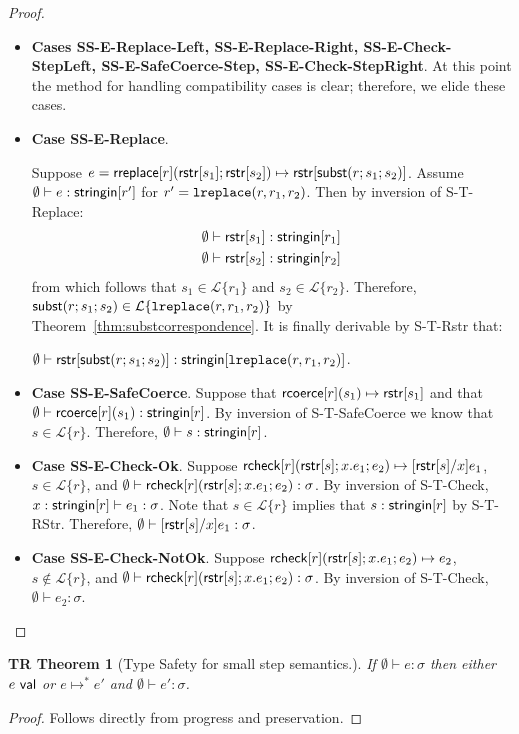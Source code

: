 \documentclass[12pt]{article}
\newcommand{\todo}[1]{{\color{red} #1}}
\newtheorem{trthm}[tr]{TR Theorem}
\theoremstyle{definition}
\newcommand{\Lagr}{\mathcal{L}}
\newcommand{\lang}[1]{\Lagr\{#1\}}
\newcommand{\rcoerce}[2]{{\sf rcoerce}[#1](#2)}
\newcommand{\val}{{\sf val}}
\newcommand{\rcheck}[4]{ {\sf rcheck}[#1](#2;#3;#4) }
\newcommand{\stringin}[1]{{\sf stringin}[#1]}
\newcommand{\lsubst}[3]{{\sf subst}(#1;#2;#3)} %
\newcommand{\lreplace}[3]{{\sf lreplace}(#1; #2; #3)}
\renewcommand{\lreplace}[3]{{\tt lreplace}(#1, #2, #3)}
\begin{document}
\begin{proof}
\begin{itemize}[label=$ $,itemsep=1ex]
\item \textbf{Cases SS-E-Replace-Left, SS-E-Replace-Right, SS-E-Check-StepLeft, SS-E-SafeCoerce-Step, SS-E-Check-StepRight}.
\todo{At this point the method for handling compatibility cases is clear; therefore,
we elide these cases.}

\item \textbf{Case SS-E-Replace}.

Suppose $e = \rreplace{r}{\rstr{s_1}}{\rstr{s_2}} \mapsto \rstr{\lsubst{r}{s_1}{s_2}}$.
Assume $\emptyset \vdash e : \stringin{r'}$ for $r' = \lreplace{r}{r_1}{r_2}$.
Then by inversion of S-T-Replace:
\begin{align*}
\emptyset &\vdash \rstr{s_1} : \stringin{r_1} \\
\emptyset &\vdash \rstr{s_2} : \stringin{r_2}
\end{align*}
from which follows that $s_1 \in \lang{r_1}$ and $s_2 \in \lang{r_2}$.
Therefore, $\lsubst{r}{s_1}{s_2} \in \lang{\lreplace{r}{r_1}{r_2}}$ by Theorem~\ref{thm:substcorrespondence}.
It is finally derivable by S-T-Rstr that:

$\emptyset \vdash \rstr{\lsubst{r}{s_1}{s_2}} : \stringin{\lreplace{r}{r_1}{r_2}}$.


\item \textbf{Case SS-E-SafeCoerce}.
Suppose that $\rcoerce{r}{s_1} \mapsto \rstr{s_1}$ and that $\emptyset\vdash \rcoerce{r}{s_1} : \stringin{r}$.
By inversion of S-T-SafeCoerce we know that $s \in \lang{r}$. Therefore, $\emptyset\vdash s : \stringin{r}$.

\item \textbf{Case SS-E-Check-Ok}.
Suppose $\rcheck{r}{\rstr{s}}{x.e_1}{e_2} \mapsto \subst{\rstr{s}}{x}{e_1}$,
$s \in \lang{r}$, and $\emptyset \vdash \rcheck{r}{\rstr{s}}{x.e_1}{e_2} : \sigma$.
By inversion of S-T-Check, $x : \stringin{r} \vdash e_1 : \sigma$.
Note that $s \in \lang{r}$ implies that $s : \stringin{r}$ by S-T-RStr.
Therefore, $\emptyset \vdash [{\sf rstr}[s]/x]e_1 : \sigma$.

\item \textbf{Case SS-E-Check-NotOk}.
Suppose $\rcheck{r}{\rstr{s}}{x.e_1}{e_2} \mapsto e_2$,
$s \not \in \lang{r}$, and $\emptyset \vdash \rcheck{r}{\rstr{s}}{x.e_1}{e_2} : \sigma$.
By inversion of S-T-Check, $\emptyset \vdash e_2 : \sigma$.

\end{itemize}
\end{proof}


\begin{trthm}[Type Safety for small step semantics.] \label{thm:sstypesafte}
If $\emptyset\vdash e : \sigma$ then either $e \ \val$ or $e \mapsto^* e'$ and $\emptyset\vdash e' : \sigma$.
\end{trthm}
\begin{proof}
\todo{Follows directly from progress and preservation.}
\end{proof}
\end{document}

